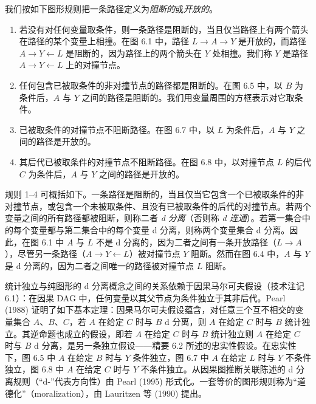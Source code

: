 \begin{finepoint}[d 分离]
我们按如下图形规则把一条路径定义为\emph{阻断的}或\emph{开放的}。

\begin{enumerate}
\item 若没有对任何变量取条件，则一条路径是阻断的，当且仅当路径上有两个箭头在路径的某个变量上相撞。在图 6.1 中，路径 $L\to A\to Y$ 是开放的，而路径 $A\to Y\leftarrow L$ 是阻断的，因为路径上的两个箭头在 $Y$ 处相撞。我们称 $Y$ 是路径 $A\to Y\leftarrow L$ 上的对撞节点。
\item 任何包含已被取条件的非对撞节点的路径都是阻断的。在图 6.5 中，以 $B$ 为条件后，$A$ 与 $Y$ 之间的路径是阻断的。我们用变量周围的方框表示对它取条件。
\item 已被取条件的对撞节点不阻断路径。在图 6.7 中，以 $L$ 为条件后，$A$ 与 $Y$ 之间的路径是开放的。
\item 其后代已被取条件的对撞节点不阻断路径。在图 6.8 中，以对撞节点 $L$ 的后代 $C$ 为条件后，$A$ 与 $Y$ 之间的路径是开放的。
\end{enumerate}

规则 1--4 可概括如下。一条路径是阻断的，当且仅当它包含一个已被取条件的非对撞节点，或包含一个未被取条件、且没有已被取条件的后代的对撞节点。若两个变量之间的所有路径都被阻断，则称二者 \emph{d 分离}（否则称 \emph{d 连通}）。若第一集合中的每个变量都与第二集合中的每个变量 d 分离，则称两个变量集合 d 分离。因此，在图 6.1 中 $A$ 与 $L$ 不是 d 分离的，因为二者之间有一条开放路径（$L\to A$），尽管另一条路径（$A\to Y\leftarrow L$）被对撞节点 $Y$ 阻断。然而在图 6.4 中，$A$ 与 $Y$ 是 d 分离的，因为二者之间唯一的路径被对撞节点 $L$ 阻断。

统计独立与纯图形的 d 分离概念之间的关系依赖于因果马尔可夫假设（技术注记 6.1）：在因果 DAG 中，任何变量以其父节点为条件独立于其非后代。Pearl (1988) 证明了如下基本定理：因果马尔可夫假设蕴含，对任意三个互不相交的变量集合 $A$、$B$、$C$，若 $A$ 在给定 $C$ 时与 $B$ d 分离，则 $A$ 在给定 $C$ 时与 $B$ 统计独立。其逆命题也成立的假设，即若 $A$ 在给定 $C$ 时与 $B$ 统计独立则 $A$ 在给定 $C$ 时与 $B$ d 分离，是另一条独立假设——精要 6.2 所述的忠实性假设。在忠实性下，图 6.5 中 $A$ 在给定 $B$ 时与 $Y$ 条件独立，图 6.7 中 $A$ 在给定 $L$ 时与 $Y$ 不条件独立，图 6.8 中 $A$ 在给定 $C$ 时与 $Y$ 不条件独立。从因果图推断关联陈述的 d 分离规则（“d-”代表方向性）由 Pearl (1995) 形式化。一套等价的图形规则称为“道德化”（moralization），由 Lauritzen 等 (1990) 提出。
\end{finepoint}

